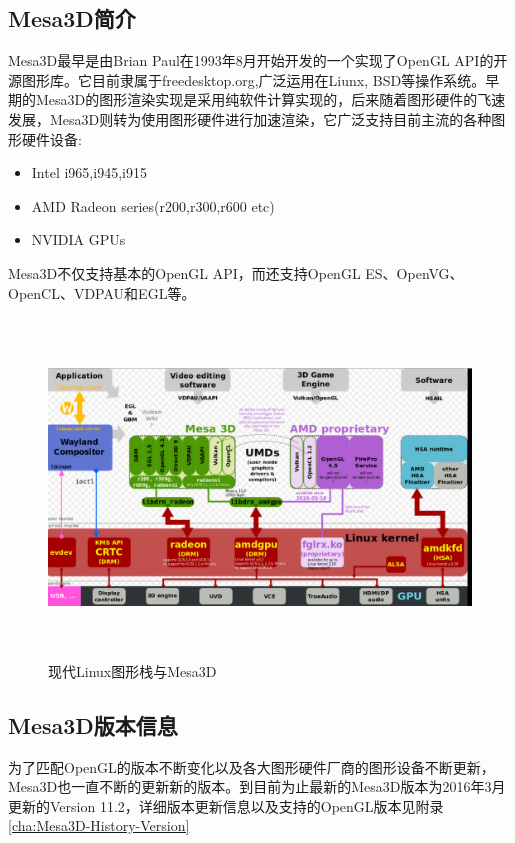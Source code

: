 
\subsection{Mesa3D简介}
Mesa3D最早是由Brian Paul在1993年8月开始开发的一个实现了OpenGL API的开源图形库\cite{Mesa-Wiki}。它目前隶属于freedesktop.org,广泛运用在Liunx, BSD等操作系统。早期的Mesa3D的图形渲染实现是采用纯软件计算实现的，后来随着图形硬件的飞速发展，Mesa3D则转为使用图形硬件进行加速渲染，它广泛支持目前主流的各种图形硬件设备:
\begin{itemize}
\item{}Intel i965,i945,i915
\item{}AMD Radeon series(r200,r300,r600 etc)
\item{}NVIDIA GPUs
\end{itemize}
Mesa3D不仅支持基本的OpenGL API，而还支持OpenGL ES、OpenVG、OpenCL、VDPAU和EGL等。

\begin{figure}[H] 
  \centering
  \includegraphics[width=14cm,height=9cm]{figures/chap01/linux-mesa}
  \caption{现代Linux图形栈与Mesa3D}
  \label{fig:linux-mesa}
\end{figure}

\subsection{Mesa3D版本信息}
为了匹配OpenGL的版本不断变化以及各大图形硬件厂商的图形设备不断更新，Mesa3D也一直不断的更新新的版本。到目前为止最新的Mesa3D版本为2016年3月更新的Version 11.2，详细版本更新信息以及支持的OpenGL版本见附录\ref{cha:Mesa3D-History-Version}
